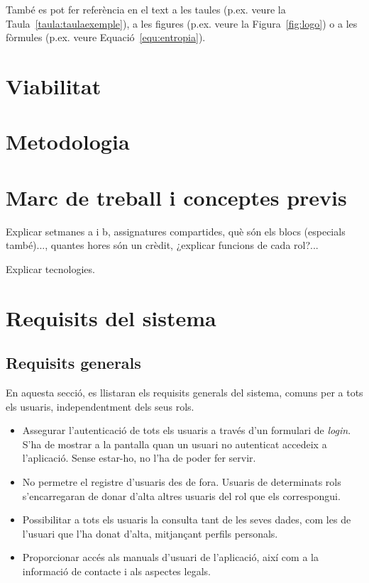 \documentclass[a4paper,12pt]{ThesisStyle}
\begin{document}
També es pot fer referència en el text a les taules (p.ex. veure la Taula~\ref{taula:taulaexemple}), a les figures (p.ex. veure la Figura~\ref{fig:logo}) o a les fòrmules (p.ex. veure Equació~\ref{equ:entropia}).



\chapter{Viabilitat}
\label{cap:viabilitat}



\chapter{Metodologia}
\label{cap:metodologia}



\chapter{Marc de treball i conceptes previs}
\label{cap:marcdetreball}
Explicar setmanes a i b, assignatures compartides, què són els blocs (especials també)..., quantes hores
són un crèdit, ¿explicar funcions de cada rol?... 



Explicar tecnologies.



\chapter{Requisits del sistema}
\label{cap:requisits}

\section{Requisits generals}
\label{sec:requisits_generals} %

En aquesta secció, es llistaran els requisits generals del sistema, comuns per a tots els usuaris, independentment dels seus rols.

\begin{itemize}
  \item Assegurar l'autenticació de tots els usuaris a través d'un formulari de \emph{login}. S'ha de mostrar a la pantalla quan un usuari no autenticat accedeix a l'aplicació. Sense estar-ho, no l'ha de poder fer servir.
  \item No permetre el registre d'usuaris des de fora. Usuaris de determinats rols s'encarregaran de donar d'alta altres usuaris del rol que els correspongui.
  \item Possibilitar a tots els usuaris la consulta tant de les seves dades, com les de l'usuari que l'ha donat d'alta, mitjançant perfils personals.
  \item Proporcionar accés als manuals d'usuari de l'aplicació, així com a la informació de contacte i als aspectes legals.
\end{itemize}
\end{document}
